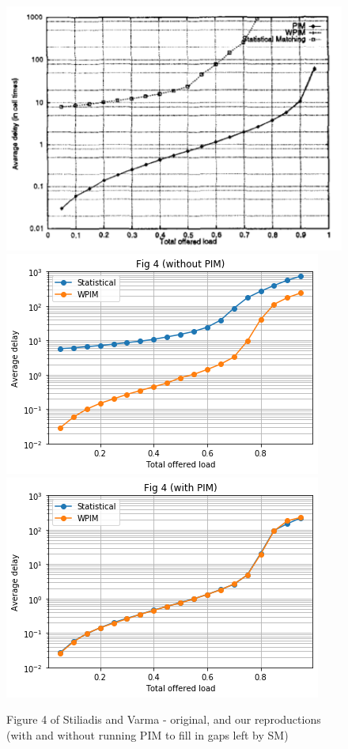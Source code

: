 \begin{figure}
    \centering
    \includegraphics[width=\linewidth]{figures/stiliadis_fig4_original.png}
    \includegraphics[width=\linewidth]{figures/stiliadis_fig4_no_pim.png}
    \includegraphics[width=\linewidth]{figures/stiliadis_fig4_pim.png}
    \caption{Figure 4 of Stiliadis and Varma - original, and our reproductions (with and without running PIM to fill in gaps left by SM)}
    \label{fig:4-stil}
\end{figure}

